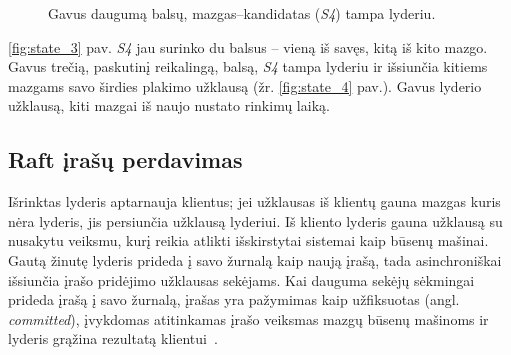 \documentclass{VUMIFPSkursinis}
\begin{document}
\begin{figure}[H]
\centering
    \hfill
    
    \caption{Gavus daugumą balsų, mazgas--kandidatas (\textit{S4}) tampa lyderiu.}

\end{figure}

\ref{fig:state_3} pav. \textit{S4} jau surinko du balsus -- vieną iš savęs, kitą iš kito mazgo. Gavus trečią, paskutinį reikalingą, balsą, \textit{S4} tampa lyderiu ir išsiunčia kitiems mazgams savo širdies plakimo užklausą (žr. \ref{fig:state_4} pav.). Gavus lyderio užklausą, kiti mazgai iš naujo nustato rinkimų laiką. 

\subsection{Raft įrašų perdavimas}

Išrinktas lyderis aptarnauja klientus; jei užklausas iš klientų gauna mazgas kuris nėra lyderis, jis persiunčia užklausą lyderiui. Iš kliento lyderis gauna užklausą su nusakytu veiksmu, kurį reikia atlikti išskirstytai sistemai kaip būsenų mašinai. Gautą žinutę lyderis prideda į savo žurnalą kaip naują įrašą, tada asinchroniškai išsiunčia įrašo pridėjimo užklausas sekėjams. Kai dauguma sekėjų sėkmingai prideda įrašą į savo žurnalą, įrašas yra pažymimas kaip užfiksuotas (angl. \textit{committed}), įvykdomas atitinkamas įrašo veiksmas mazgų būsenų mašinoms ir lyderis grąžina rezultatą klientui~\cite{ongaro_consensus}. 
\end{document}
